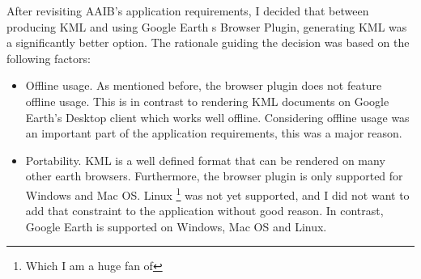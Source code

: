After revisiting AAIB's application requirements, I decided that between producing KML and using Google Earth
s Browser Plugin, generating KML was a significantly better option. The rationale guiding the decision was based on the following factors:

\begin{itemize}
\item Offline usage. As mentioned before, the browser plugin does not feature offline usage. This is in contrast to rendering KML documents on Google Earth's Desktop client which works well offline. Considering offline usage was an important part of the application requirements, this was a major reason.
\item Portability. KML is a well defined format that can be rendered on many other earth browsers. Furthermore, the browser plugin is only supported for Windows and Mac OS. Linux \footnote{Which I am a huge fan of} was not yet supported, and I did not want to add that constraint to the application without good reason. In contrast, Google Earth is supported on Windows, Mac OS and Linux.
\end{itemize}
